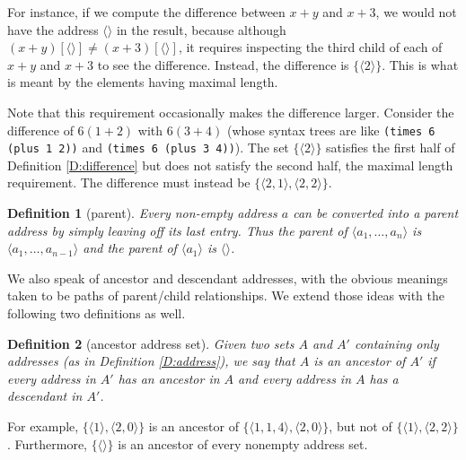 \documentclass{article}
\newtheorem{dfn}{Definition}
\begin{document}
For instance, if we compute the difference between $x+y$ and $x+3$, we would not have the address $\langle\rangle$ in the result, because although $(x+y)[\langle\rangle]\neq(x+3)[\langle\rangle]$, it requires inspecting the third child of each of $x+y$ and $x+3$ to see the difference.  Instead, the difference is $\{\langle2\rangle\}$.  This is what is meant by the elements having maximal length.

Note that this requirement occasionally makes the difference larger.  Consider the difference of $6(1+2)$ with $6(3+4)$ (whose syntax trees are like \verb'(times 6 (plus 1 2))' and \verb'(times 6 (plus 3 4))').  The set $\{\langle2\rangle\}$ satisfies the first half of Definition \ref{D:difference} but does not satisfy the second half, the maximal length requirement.  The difference must instead be $\{\langle2,1\rangle,\langle2,2\rangle\}$.

\begin{dfn}[parent]
Every non-empty address $a$ can be converted into a \emph{parent} address by simply leaving off its last entry.  Thus the parent of $\langle a_1,\ldots,a_n\rangle$ is $\langle a_1,\ldots,a_{n-1}\rangle$ and the parent of $\langle a_1\rangle$ is $\langle\rangle$.
\end{dfn}

We also speak of ancestor and descendant addresses, with the obvious meanings taken to be paths of parent/child relationships.  We extend those ideas with the following two definitions as well.

\begin{dfn}[ancestor address set]\label{D:ancestor set}
Given two sets $A$ and $A'$ containing only addresses (as in Definition \ref{D:address}), we say that $A$ is an \emph{ancestor} of $A'$ if every address in $A'$ has an ancestor in $A$ and every address in $A$ has a descendant in $A'$.
\end{dfn}

For example, $\{\langle1\rangle,\langle2,0\rangle\}$ is an ancestor of $\{\langle1,1,4\rangle,\langle2,0\rangle\}$, but not of $\{\langle1\rangle,\langle2,2\rangle\}$.  Furthermore, $\{\langle\rangle\}$ is an ancestor of every nonempty address set.
\end{document}
